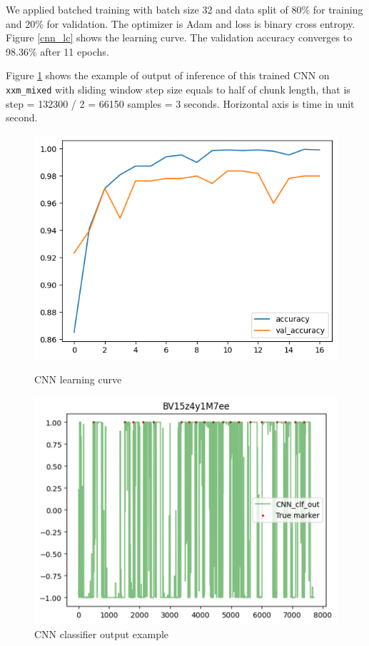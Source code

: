 \documentclass{article}
\begin{document}
    We applied batched training with batch size 32 and data split of 80\% for training and 20\% for validation. The optimizer is Adam and loss is binary cross entropy. Figure \ref{cnn_lc} shows the learning curve. The validation accuracy converges to 98.36\% after 11 epochs.

    Figure \ref{cnn_output} shows the example of output of inference of this trained CNN on \lstinline|xxm_mixed| with sliding window step size equals to half of chunk length, that is step = 132300 / 2 = 66150 samples = 3 seconds. Horizontal axis is time in unit second.
    \begin{figure}[H]
        \begin{minipage}{0.49\linewidth}
            \includegraphics[width=\linewidth]{figures/cnn_lc.png}
            \caption{CNN learning curve}
            \label{cnn_lc}
        \end{minipage}
        \begin{minipage}{0.49\linewidth}
            \includegraphics[width=\linewidth]{figures/cnn_output.png}
            \caption{CNN classifier output example}
            \label{cnn_output}
        \end{minipage}
    \end{figure}
\end{document}
